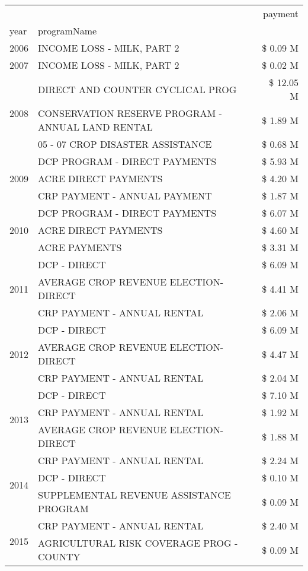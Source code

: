 \begin{tabular}{llr}
\toprule
 &  & payment \\
year & programName &  \\
\midrule
2006 & INCOME LOSS - MILK, PART 2 & \$ 0.09 M \\
\cline{1-3}
2007 & INCOME LOSS - MILK, PART 2 & \$ 0.02 M \\
\cline{1-3}
\multirow[t]{3}{*}{2008} & DIRECT AND COUNTER CYCLICAL PROG & \$ 12.05 M \\
 & CONSERVATION RESERVE PROGRAM - ANNUAL LAND RENTAL & \$ 1.89 M \\
 & 05 - 07 CROP DISASTER ASSISTANCE & \$ 0.68 M \\
\cline{1-3}
\multirow[t]{3}{*}{2009} & DCP PROGRAM - DIRECT PAYMENTS & \$ 5.93 M \\
 & ACRE DIRECT PAYMENTS & \$ 4.20 M \\
 & CRP PAYMENT - ANNUAL PAYMENT & \$ 1.87 M \\
\cline{1-3}
\multirow[t]{3}{*}{2010} & DCP PROGRAM - DIRECT PAYMENTS & \$ 6.07 M \\
 & ACRE DIRECT PAYMENTS & \$ 4.60 M \\
 & ACRE PAYMENTS & \$ 3.31 M \\
\cline{1-3}
\multirow[t]{3}{*}{2011} & DCP - DIRECT & \$ 6.09 M \\
 & AVERAGE CROP REVENUE ELECTION-DIRECT & \$ 4.41 M \\
 & CRP PAYMENT - ANNUAL RENTAL & \$ 2.06 M \\
\cline{1-3}
\multirow[t]{3}{*}{2012} & DCP - DIRECT & \$ 6.09 M \\
 & AVERAGE CROP REVENUE ELECTION-DIRECT & \$ 4.47 M \\
 & CRP PAYMENT - ANNUAL RENTAL & \$ 2.04 M \\
\cline{1-3}
\multirow[t]{3}{*}{2013} & DCP - DIRECT & \$ 7.10 M \\
 & CRP PAYMENT - ANNUAL RENTAL & \$ 1.92 M \\
 & AVERAGE CROP REVENUE ELECTION-DIRECT & \$ 1.88 M \\
\cline{1-3}
\multirow[t]{3}{*}{2014} & CRP PAYMENT - ANNUAL RENTAL & \$ 2.24 M \\
 & DCP - DIRECT & \$ 0.10 M \\
 & SUPPLEMENTAL REVENUE ASSISTANCE PROGRAM & \$ 0.09 M \\
\cline{1-3}
\multirow[t]{3}{*}{2015} & CRP PAYMENT - ANNUAL RENTAL & \$ 2.40 M \\
 & AGRICULTURAL RISK COVERAGE PROG - COUNTY & \$ 0.09 M \\

\end{tabular}
